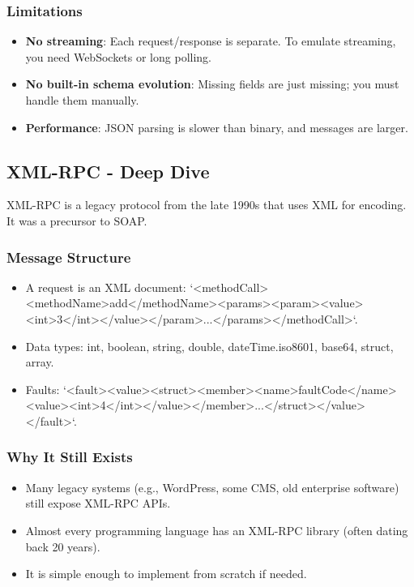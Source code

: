 \documentclass[10pt,a4paper]{article}
\begin{document}
\subsubsection{Limitations}
\begin{itemize}
    \item \textbf{No streaming}: Each request/response is separate. To emulate streaming, you need WebSockets or long polling.
    \item \textbf{No built-in schema evolution}: Missing fields are just missing; you must handle them manually.
    \item \textbf{Performance}: JSON parsing is slower than binary, and messages are larger.
\end{itemize}

\subsection{XML-RPC - Deep Dive}
XML-RPC is a legacy protocol from the late 1990s that uses XML for encoding. It was a precursor to SOAP.

\subsubsection{Message Structure}
\begin{itemize}
    \item A request is an XML document: `<methodCall><methodName>add</methodName><params><param><value><int>3</int></value></param>...</params></methodCall>`.
    \item Data types: int, boolean, string, double, dateTime.iso8601, base64, struct, array.
    \item Faults: `<fault><value><struct><member><name>faultCode</name><value><int>4</int></value></member>...</struct></value></fault>`.
\end{itemize}

\subsubsection{Why It Still Exists}
\begin{itemize}
    \item Many legacy systems (e.g., WordPress, some CMS, old enterprise software) still expose XML-RPC APIs.
    \item Almost every programming language has an XML-RPC library (often dating back 20 years).
    \item It is simple enough to implement from scratch if needed.
\end{itemize}
\end{document}
